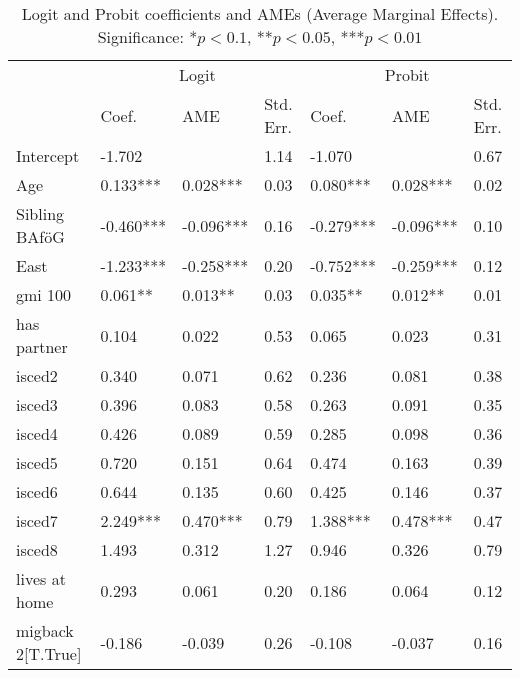 \begin{table}[htbp]
\centering
\footnotesize
\caption{Logit and Probit coefficients and AMEs (Average Marginal Effects). Significance: *\( p < 0.1 \), **\( p < 0.05 \), ***\( p < 0.01 \)}
\label{tab:logit-probit-ame}
\begin{tabular}{lllllll}
\toprule
             & \multicolumn{3}{c}{Logit}           & \multicolumn{3}{c}{Probit} \\
\cmidrule(lr){2-4} \cmidrule(lr){5-7}
             & Coef.    & AME      & Std. Err.   & Coef.    & AME      & Std. Err. \\
\midrule
Intercept               & -1.702    &            & 1.14     & -1.070    &            & 0.67     \\
Age                     & 0.133***  & 0.028***   & 0.03     & 0.080***  & 0.028***   & 0.02     \\
Sibling BAföG           & -0.460*** & -0.096***  & 0.16     & -0.279*** & -0.096***  & 0.10     \\
East                    & -1.233*** & -0.258***  & 0.20     & -0.752*** & -0.259***  & 0.12     \\
gmi 100                 & 0.061**   & 0.013**    & 0.03     & 0.035**   & 0.012**    & 0.01     \\
has partner             & 0.104     & 0.022      & 0.53     & 0.065     & 0.023      & 0.31     \\
isced2                  & 0.340     & 0.071      & 0.62     & 0.236     & 0.081      & 0.38     \\
isced3                  & 0.396     & 0.083      & 0.58     & 0.263     & 0.091      & 0.35     \\
isced4                  & 0.426     & 0.089      & 0.59     & 0.285     & 0.098      & 0.36     \\
isced5                  & 0.720     & 0.151      & 0.64     & 0.474     & 0.163      & 0.39     \\
isced6                  & 0.644     & 0.135      & 0.60     & 0.425     & 0.146      & 0.37     \\
isced7                  & 2.249***  & 0.470***   & 0.79     & 1.388***  & 0.478***   & 0.47     \\
isced8                  & 1.493     & 0.312      & 1.27     & 0.946     & 0.326      & 0.79     \\
lives at home           & 0.293     & 0.061      & 0.20     & 0.186     & 0.064      & 0.12     \\
migback 2[T.True]       & -0.186    & -0.039     & 0.26     & -0.108    & -0.037     & 0.16     \\

\end{tabular}
\end{table}

